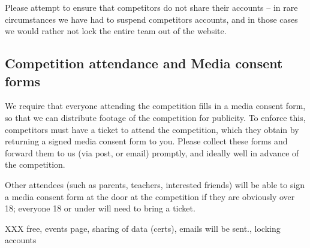 \documentclass[a4paper]{article}
\begin{document}
Please attempt to ensure that competitors do not share their accounts -- in rare
circumstances we have had to suspend competitors accounts, and in those cases
we would rather not lock the entire team out of the website.

\subsection*{Competition attendance and Media consent forms}
 
We require that everyone attending the competition fills in a media consent
form, so that we can distribute footage of the competition for publicity.
To enforce this, competitors must have a ticket to attend the competition,
which they obtain by returning a signed media consent form to you. Please
collect these forms and forward them to us (via post, or email) promptly,
and ideally well in advance of the competition.

Other attendees (such as parents, teachers, interested friends) will be able
to sign a media consent form at the door at the competition if they are
obviously over 18; everyone 18 or under will need to bring a ticket.

XXX free, events page, sharing of data (certs), emails will be sent., locking accounts
\end{document}
